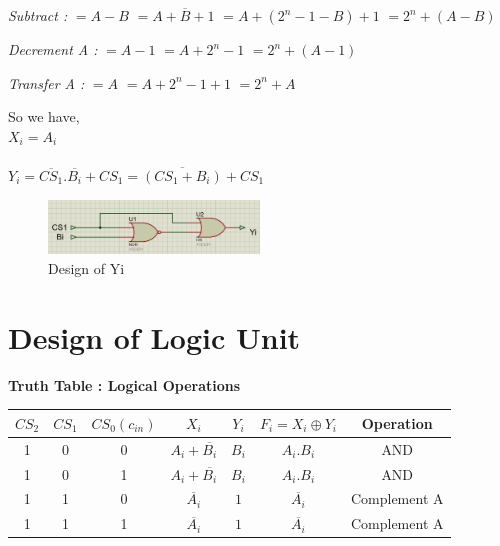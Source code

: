 \documentclass[]{article}
\begin{document}
	\noindent\textit{Subtract : } \newline
	$=A-B$ \newline
	$=A+\overline{B}+1$ \newline
	$=A+(2^n-1-B)+1$\newline
	$=2^n+(A-B)$\newline

	\noindent\textit{Decrement A :}\newline
	$=A-1$ \newline
	$=A+2^n-1 $ \newline
	$=2^n+(A-1)$ \newline

	\noindent\textit{Transfer A :}\newline
	$=A$ \newline
	$=A+2^n-1+1 $ \newline
	$=2^n+A$
	\newline

	\noindent So we have, \newline\\
	$X_i=A_i$\\\\
	$Y_i=\overline{CS_1}.\overline{B_i}+CS_1 = \overline{(CS_1+B_i)}+CS_1$
	\begin{figure}[h!]
		\centering
		\includegraphics[width = 0.5\textwidth]{Yi.PNG}
		\caption{Design of Yi}
		\label{fig:ckt1}
		
	\end{figure}
	
	\section{Design of Logic Unit}
	\textbf{Truth Table : Logical Operations}
		\begin{center}
		\begin{tabular}{ |c|c|c|c|c|c|c| } 
			\hline
			$CS_2$ & $CS_1$ & $CS_0(c_{in})$ & $X_i$ & $Y_i$ & $F_i=X_i \oplus Y_i$ & Operation \\
			\hline
			
			\hline
			1 & 0 & 0 & $A_i+\overline{B_i}$ & $B_i$ & $A_i.B_i$ & AND \\
			\hline
			
			\hline
			1 & 0 & 1 & $A_i+\overline{B_i}$ & $B_i$ & $A_i.B_i$ & AND \\
			\hline
			
			\hline
			1 & 1 & 0 & $\overline{A_i}$ & $1$ & $\overline{A_i}$ & Complement A \\
			\hline
			
			\hline
			1 & 1 & 1 & $\overline{A_i}$ & $1$ & $\overline{A_i}$ & Complement A\\
			\hline
		\end{tabular}
	\end{center}
\end{document}
